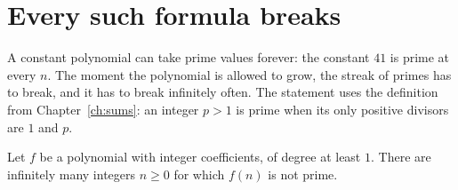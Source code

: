 \section*{Every such formula breaks}
A constant polynomial can take prime values forever: the constant $41$ is prime at every $n$. The moment the polynomial is allowed to grow, the streak of primes has to break, and it has to break infinitely often. The statement uses the definition from Chapter~\ref{ch:sums}: an integer $p>1$ is prime when its only positive divisors are $1$ and $p$.

\begin{theoremx}
Let $f$ be a polynomial with integer coefficients, of degree at least $1$. There are infinitely many integers $n\ge0$ for which $f(n)$ is not prime.
\end{theoremx}


